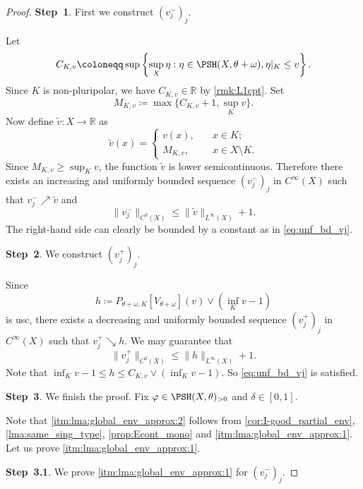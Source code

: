 \begin{proof}
    \textbf{Step~1}. First we construct $(v^-_j)_j$.

    Let
    \[
        C_{K,v} \coloneqq \sup\left\{\sup_X \eta : \eta \in \PSH(X,\theta+\omega),  \eta|_K \leq v\right\}.
    \]
    Since $K$ is non-pluripolar, we have $C_{K,v} \in \mathbb{R}$ by \cref{rmk:L1cpt}.
    Set
    \[
    M_{K,v}\coloneqq \max\{C_{K,v}+1,\sup_K v\}.
    \]
    Now define $\widetilde v \colon X \to \mathbb{R}$ as
    \[
    \widetilde{v}(x)=\left\{
    \begin{aligned}
        v(x),&\quad x\in K;\\
        M_{K,v},&\quad x\in X\setminus K.
    \end{aligned}
    \right.
    \]
    Since $M_{K,v}\geq \sup_K v$, the function $\widetilde v$ is lower semicontinuous. Therefore there exists an increasing and uniformly bounded sequence $(v^-_j)_j$ in $C^\infty(X)$ such that $v^-_j \nearrow \widetilde v$ and
    \[
        \|v_j^-\|_{C^0(X)}\leq \|\tilde{v}\|_{L^{\infty}(X)}+1.
    \]
    The right-hand side can clearly be bounded by a constant as in \eqref{eq:unf_bd_vj}.

    \textbf{Step~2}. We construct $(v_j^+)_j$.

    Since
\[
h \coloneqq P_{\theta + \omega,K}[V_{\theta+\omega}](v) \lor \left(\inf_K v -1\right)
\]
is usc, there exists a decreasing and uniformly bounded sequence $(v^+_j)_j$ in $C^\infty(X)$ such that $v^+_j \searrow h$. We may guarantee that
\[
\|v^+_j\|_{C^0(X)}\leq \|h\|_{L^{\infty}(X)}+1.
\]
Note that $\inf_K v-1\leq h\leq C_{K,v} \lor (\inf_K v-1)$. So \eqref{eq:unf_bd_vj} is satisfied.




\textbf{Step~3}. We finish the proof. Fix $\varphi\in \PSH(X,\theta)_{>0}$ and $\delta\in [0,1]$.

Note that \ref{itm:lma:global_env_approx:2} follows from \cref{cor:I-good_partial_env}, \cref{lma:same_sing_type}, \cref{prop:Econt_mono} and \ref{itm:lma:global_env_approx:1}. Let us prove \ref{itm:lma:global_env_approx:1}.

\textbf{Step~3.1}. We prove \ref{itm:lma:global_env_approx:1} for $(v^-_j)_j$.


\end{proof}
